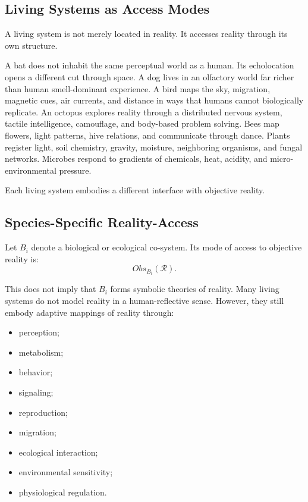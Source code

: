 \documentclass[11pt,a4paper]{article}
\begin{document}
\subsection{Living Systems as Access Modes}

A living system is not merely located in reality. It accesses reality through its own structure.

A bat does not inhabit the same perceptual world as a human. Its echolocation opens a different cut through space. A dog lives in an olfactory world far richer than human smell-dominant experience. A bird maps the sky, migration, magnetic cues, air currents, and distance in ways that humans cannot biologically replicate. An octopus explores reality through a distributed nervous system, tactile intelligence, camouflage, and body-based problem solving. Bees map flowers, light patterns, hive relations, and communicate through dance. Plants register light, soil chemistry, gravity, moisture, neighboring organisms, and fungal networks. Microbes respond to gradients of chemicals, heat, acidity, and micro-environmental pressure.

Each living system embodies a different interface with objective reality.

\subsection{Species-Specific Reality-Access}

Let $B_i$ denote a biological or ecological co-system. Its mode of access to objective reality is:
\[
Obs_{B_i}(\mathcal{R}).
\]

This does not imply that $B_i$ forms symbolic theories of reality. Many living systems do not model reality in a human-reflective sense. However, they still embody adaptive mappings of reality through:
\begin{itemize}[leftmargin=2em]
\item perception;
\item metabolism;
\item behavior;
\item signaling;
\item reproduction;
\item migration;
\item ecological interaction;
\item environmental sensitivity;
\item physiological regulation.
\end{itemize}
\end{document}
